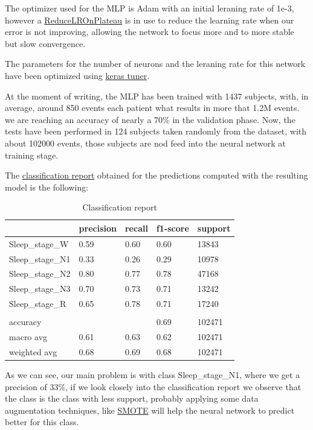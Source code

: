 The optimizer used for the MLP is Adam with an initial leraning rate of 1e-3, however a \href{https://keras.io/api/callbacks/reduce_lr_on_plateau/}{ReduceLROnPlateau} is in use to reduce the learning rate when our error is not improving, allowing the network to focus more and to more stable but slow convergence.

The parameters for the number of neurons and the leraning rate for this network have been optimized using \href{https://keras.io/keras_tuner/}{keras tuner}.

At the moment of writing, the MLP has been trained with 1437 subjects, with, in average, around 850 events each patient what results in more that 1.2M events. we are reaching an accuracy of nearly a 70\% in the validation phase. Now, the tests have been performed in 124 subjects taken randomly from the dataset, with about 102000 events, those subjects are nod feed into the neural network at training stage.

The \href{https://scikit-learn.org/stable/modules/generated/sklearn.metrics.classification_report.html}{classification report} obtained for the predictions computed with the resulting model is the following:

\begin{table}[H]
\begin{center}
\begin{tabular}{ |p{3cm}||p{2cm}||p{2cm}||p{2cm}||p{2cm}| }
 \hline
 & precision & recall & f1-score & support\\
 \hline  
 Sleep\_stage\_W & 0.59 & 0.60 & 0.60 & 13843 \\
 Sleep\_stage\_N1 & 0.33 & 0.26 & 0.29 & 10978 \\
 Sleep\_stage\_N2 & 0.80 & 0.77 & 0.78 & 47168 \\
 Sleep\_stage\_N3 & 0.70 & 0.73 & 0.71 & 13242 \\
 Sleep\_stage\_R & 0.65 & 0.78 & 0.71 & 17240 \\
 & & & & \\
 accuracy &  &  & 0.69 & 102471 \\
 macro avg & 0.61 & 0.63 & 0.62 & 102471 \\
 weighted avg & 0.68 & 0.69 & 0.68 & 102471 \\
 \hline
\end{tabular}
\end{center}
\caption{Classification report}
\label{tab4}
\end{table}

As we can see, our main problem is with class Sleep\_stage\_N1, where we get a precision of 33\%, if we look closely into the classification report we observe that the class is the class with less support, probably applying some data augmentation techniques, like \href{https://imbalanced-learn.org/stable/references/generated/imblearn.over_sampling.SMOTE.html}{SMOTE} will help the neural network to predict better for this class.

